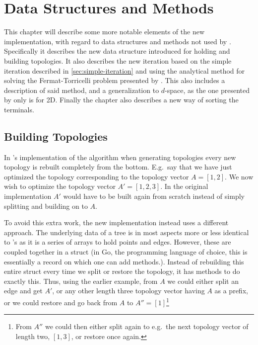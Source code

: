  {
\abnormalparskip{0pt}
\chapter{Data Structures and Methods}
\label{cha:data-structures}
}

This chapter will describe some more notable elements of the new implementation,
with regard to data structures and methods not used by
\textcite{smith1992}. Specifically it describes the new data structure
introduced for holding and building topologies. It also describes the new
iteration based on the simple iteration described in \cref{sec:simple-iteration}
and using the analytical method for solving the Fermat-Torricelli problem
presented by \textcite{uteshev2014}. This also includes a description of said
method, and a generalization to $d$-space, as the one presented by
\textcite{uteshev2014} only is for 2D. Finally the chapter also describes a new
way of sorting the terminals.

\section{Building Topologies}
\label{sec:building-topologies}

In \citeauthor{smith1992}'s implementation of the algorithm when generating
topologies every new topology is rebuilt completely from the bottom. E.g.\ say
that we have just optimized the topology corresponding to the topology vector
$A = [1, 2]$. We now wish to optimize the topology vector
$A' = [1, 2, 3]$. In the original implementation $A'$ would have to be built again
from scratch instead of simply splitting and building on to $A$.

To avoid this extra work, the new implementation instead uses a different
approach. The underlying data of a tree is in most aspects more or less
identical to \citeauthor{smith1992}'s as it is a series of arrays to hold points
and edges. However, these are coupled together in a struct (in Go, the
programming language of choice, this is essentially a record on which one can add
methods.). Instead of rebuilding this entire struct every time we split or
restore the topology, it has methods to do exactly this. Thus, using the earlier
example, from $A$ we could either split an
edge and get $A'$, or any other length three topology vector having $A$ as a
prefix, or we could restore and go back from $A$ to $A'' = [1]$\footnote{From
  $A''$ we could then either split again to e.g.\ the next topology vector of
  length two, $[1, 3]$, or restore once again.}

